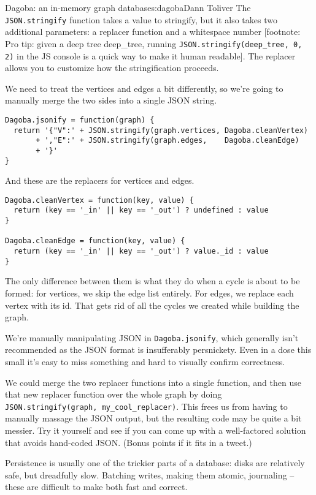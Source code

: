 \begin{aosachapter}{Dagoba: an in-memory graph database}{s:dagoba}{Dann Toliver}
The \texttt{JSON.stringify} function takes a value to stringify, but it
also takes two additional parameters: a replacer function and a
whitespace number {[}footnote: Pro tip: given a deep tree deep\_tree,
running \texttt{JSON.stringify(deep\_tree, 0, 2)} in the JS console is a
quick way to make it human readable{]}. The replacer allows you to
customize how the stringification proceeds.

We need to treat the vertices and edges a bit differently, so we're
going to manually merge the two sides into a single JSON string.

\begin{verbatim}
Dagoba.jsonify = function(graph) {
  return '{"V":' + JSON.stringify(graph.vertices, Dagoba.cleanVertex)
       + ',"E":' + JSON.stringify(graph.edges,    Dagoba.cleanEdge)
       + '}' 
}
\end{verbatim}

And these are the replacers for vertices and edges.

\begin{verbatim}
Dagoba.cleanVertex = function(key, value) {
  return (key == '_in' || key == '_out') ? undefined : value 
}

Dagoba.cleanEdge = function(key, value) {
  return (key == '_in' || key == '_out') ? value._id : value 
}
\end{verbatim}

The only difference between them is what they do when a cycle is about
to be formed: for vertices, we skip the edge list entirely. For edges,
we replace each vertex with its id. That gets rid of all the cycles we
created while building the graph.

We're manually manipulating JSON in \texttt{Dagoba.jsonify}, which
generally isn't recommended as the JSON format is insufferably
persnickety. Even in a dose this small it's easy to miss something and
hard to visually confirm correctness.

We could merge the two replacer functions into a single function, and
then use that new replacer function over the whole graph by doing
\texttt{JSON.stringify(graph, my\_cool\_replacer)}. This frees us from
having to manually massage the JSON output, but the resulting code may
be quite a bit messier. Try it yourself and see if you can come up with
a well-factored solution that avoids hand-coded JSON. (Bonus points if
it fits in a tweet.)

\label{persistence}

Persistence is usually one of the trickier parts of a database: disks
are relatively safe, but dreadfully slow. Batching writes, making them
atomic, journaling -- these are difficult to make both fast and correct.


\end{aosachapter}
